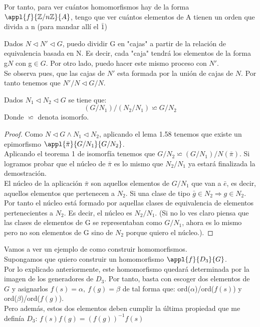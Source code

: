 \documentclass[nochap]{apuntes}
\begin{document}
Por tanto, para ver cuántos homomorfismos hay de la forma $\appl{f}{\mathbb{Z}/n\mathbb{Z}}{A}$, tengo que ver cuántos elementos
de A tienen un orden que divida a n (para mandar allí el $\bar{1}$)\\

\begin{lemma}
 Dados $N\vartriangleleft N' \vartriangleleft G$, puedo dividir G en "cajas" a partir de la relación de equivalencia basada en N. Es decir,
cada "caja" tendrá los elementos de la forma g$N$  con g$\in G$. Por otro lado, puedo hacer este mismo proceso con $N'$.\\
Se observa pues, que las cajas de $N'$  esta formada por la unión de cajas de $N$. Por tanto tenemos que $N'/N \vartriangleleft G/N$.\\
\end{lemma}

\begin{theorem}
 Dados $N_1\vartriangleleft N_2 \vartriangleleft G$  se tiene que:
 \[ (G/N_1)/(N_2/N_1)\backsimeq G/N_2\]
 Donde $\backsimeq$  denota isomorfo.
\end{theorem}

\begin{proof}
 Como $N\vartriangleleft G  \wedge  N_1 \lhd N_2$, aplicando el lema 1.58 tenemos que existe un epimorfismo $\appl{\bar{\pi}}{G/N_1}{G/N_2}$.\\
 Aplicando el teorema 1 de isomorfía tenemos que $G/N_2 \backsimeq (G/N_1)/N(\bar{\pi})$. Si logramos probar que el núcleo de $\bar{\pi}$
 es lo mismo que $N_2/N_1$  ya estará finalizada la demostración.\\
 El núcleo de la aplicación $\bar{\pi}$  son aquellos elementos de $G/N_1$  que van a $\bar{e}$, es decir, aquellos elementos que pertenecen a $N_2$.
 Si una clase de tipo $\bar{g}\in N_2 \Rightarrow g \in N_2$. Por tanto el núcleo está formado por aquellas clases de equivalencia de elementos pertenecientes a $N_2$.
 Es decir, el núcleo es $N_2/N_1$. (Si no lo ves claro piensa que las clases de elementos de G se representaban como $G/N_1$, ahora es lo mismo pero
 no son elementos de G sino de $N_2$  porque quiero el núcleo.).
\end{proof}

\begin{example}
 Vamos a ver un ejemplo de como construir homomorfismos.\\
 Supongamos que quiero construir un homomorfismo $\appl{f}{D_3}{G}$.\\
 Por lo explicado anteriormente, este homomorfismo quedará determinada por la imagen de los generadores de $D_3$. Por tanto,
 basta con escoger dos elementos de $G$  y asignarlos $f(s)=\alpha, \ f(g)=\beta$  de tal forma que: ord($\alpha$)/ord($f(s)$) y ord($\beta$)/ord($f(g)$).\\
 Pero además, estos dos elementos deben cumplir la última propiedad que me definía $D_3$: $f(s)f(g)=(f(g))^{-1}f(s)$
\end{example}
\end{document}
